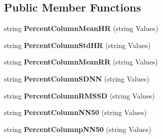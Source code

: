 \subsection*{Public Member Functions}
\begin{DoxyCompactItemize}
\item 
\hypertarget{classusertrackothers__heartrate_a42dca1c38e26e670c8e4e5cfa0e6d294}{string {\bfseries Percent\-Column\-Mean\-H\-R} (string Values)}\label{classusertrackothers__heartrate_a42dca1c38e26e670c8e4e5cfa0e6d294}

\item 
\hypertarget{classusertrackothers__heartrate_a5a74c619d2f92725b60edb3c46a0536d}{string {\bfseries Percent\-Column\-Std\-H\-R} (string Values)}\label{classusertrackothers__heartrate_a5a74c619d2f92725b60edb3c46a0536d}

\item 
\hypertarget{classusertrackothers__heartrate_abc06ddb5f7dd71d2e7942bbd406a54bd}{string {\bfseries Percent\-Column\-Mean\-R\-R} (string Values)}\label{classusertrackothers__heartrate_abc06ddb5f7dd71d2e7942bbd406a54bd}

\item 
\hypertarget{classusertrackothers__heartrate_aea8f9515dbeec9fbc559f71eee27b691}{string {\bfseries Percent\-Column\-S\-D\-N\-N} (string Values)}\label{classusertrackothers__heartrate_aea8f9515dbeec9fbc559f71eee27b691}

\item 
\hypertarget{classusertrackothers__heartrate_a77d0623c6d385d07f81bb4a9d1032ee0}{string {\bfseries Percent\-Column\-R\-M\-S\-S\-D} (string Values)}\label{classusertrackothers__heartrate_a77d0623c6d385d07f81bb4a9d1032ee0}

\item 
\hypertarget{classusertrackothers__heartrate_a366115ee0adc73703b7117683c31eaf1}{string {\bfseries Percent\-Column\-N\-N50} (string Values)}\label{classusertrackothers__heartrate_a366115ee0adc73703b7117683c31eaf1}

\item 
\hypertarget{classusertrackothers__heartrate_a656c36244617cd46eb43c042ccb54fc5}{string {\bfseries Percent\-Columnp\-N\-N50} (string Values)}\label{classusertrackothers__heartrate_a656c36244617cd46eb43c042ccb54fc5}

\end{DoxyCompactItemize}
